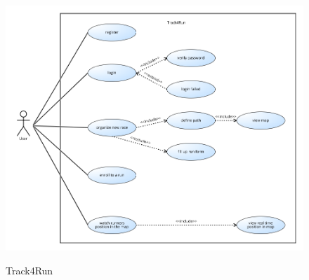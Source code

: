   
  \begin{figure}[H]
    \includegraphics[width=\linewidth, height=10cm, keepaspectratio]{./Images/RASD_Track4Run_Use_Case_Diagram.png}
    \centering
    \caption{Track4Run}
    \label{fig:sab}
  \end{figure}


